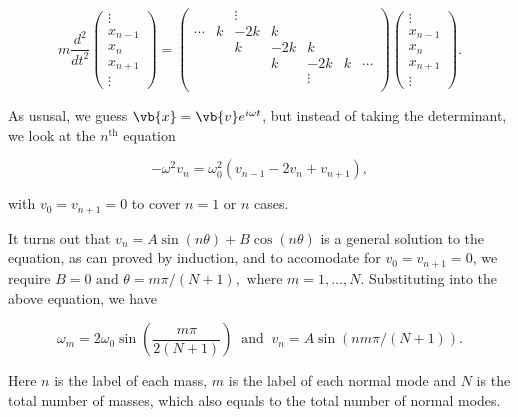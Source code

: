 \documentclass[a4paper,12pt]{report}
\begin{document}
\begin{equation}
	m \frac{d^2}{dt^2} 
\begin{pmatrix}
\vdots \\
x_{n-1} \\
x_n \\
x_{n+1} \\
\vdots
\end{pmatrix}
=
\begin{pmatrix}
	 &  & \vdots  &  &  &  &   \\
	\cdots  & k & -2k & k &  &  &   \\
	 &  & k & -2k & k &  &   \\
	 &  &  & k & -2k & k &  \cdots  \\
	 &  &  &  & \vdots  &  &   \\
\end{pmatrix}
\begin{pmatrix}
\vdots \\
x_{n-1} \\
x_n \\
x_{n+1} \\
\vdots
\end{pmatrix}.
\end{equation}

As ususal, we guess \(\vb{x} = \vb{v} e^{i \omega t} \), but instead of taking the determinant, we look at the \(n^{\text{th}} \) equation

\begin{equation}
	-\omega ^2 v_{n} = \omega _{0}^2(v_{n-1} -2v_{n} +v_{n+1} ),
\end{equation}

with \(v_{0} = v_{n+1} =0 \) to cover \(n=1 \text { or } n\) cases.  

It turns out that \(v_{n} = A \sin (n \theta ) + B\cos (n \theta ) \) is a general solution to the equation, as can proved by induction, and to accomodate for \(v_{0} = v_{n+1} = 0  \), we require \(B = 0 \text { and }  \theta = m\pi /(N+1), \text{ where } m = 1,\ldots , N \). Substituting into the above equation, we have

\begin{equation}
	\omega_{m}  = 2 \omega _{0}\sin \left( \frac{m\pi }{2(N+1)}  \right) ~\text { and }~ v_{n} = A \sin \left( nm\pi /(N+1)  \right). \label{normalmode} 
\end{equation}

Here \(n\) is the label of each mass, \(m\) is the label of each normal mode and \(N\) is the total number of masses, which also equals to the total number of normal modes.
\end{document}
